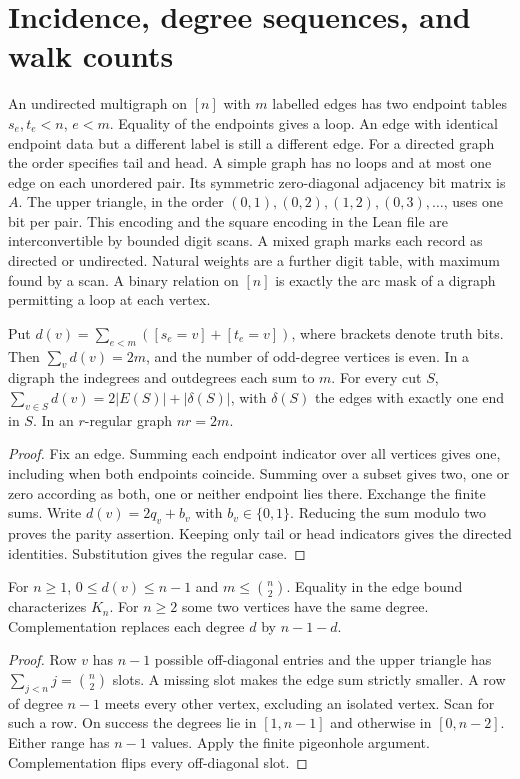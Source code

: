\section{Incidence, degree sequences, and walk counts}\label{sec:basic}
An undirected multigraph on $[n]$ with $m$ labelled edges has two endpoint
tables $s_e,t_e<n$, $e<m$. Equality of the endpoints gives a loop. An edge
with identical endpoint data but a different label is still a different edge.
For a directed graph the order specifies tail and head. A simple graph has no
loops and at most one edge on each unordered pair. Its symmetric zero-diagonal
adjacency bit matrix is $A$. The upper triangle, in the order
$(0,1),(0,2),(1,2),(0,3),\ldots$, uses one bit per pair. This encoding and the
square encoding in the Lean file are interconvertible by bounded digit scans.
A mixed graph marks each record as directed or undirected. Natural weights
are a further digit table, with maximum found by a scan. A binary relation on
$[n]$ is exactly the arc mask of a digraph permitting a loop at each vertex.

\begin{proposition}\leavevmode\label{prop:degree}
Put $d(v)=\sum_{e<m}([s_e=v]+[t_e=v])$, where brackets denote truth bits.
Then $\sum_vd(v)=2m$, and the number of odd-degree vertices is even. In a
digraph the indegrees and outdegrees each sum to $m$. For every cut $S$,
$\sum_{v\in S}d(v)=2|E(S)|+|\delta(S)|$, with $\delta(S)$ the edges with
exactly one end in $S$. In an $r$-regular graph $nr=2m$.
\end{proposition}
\begin{proof}
Fix an edge. Summing each endpoint indicator over all vertices gives one,
including when both endpoints coincide. Summing over a subset gives two,
one or zero according as both, one or neither endpoint lies there. Exchange
the finite sums. Write $d(v)=2q_v+b_v$ with $b_v\in\{0,1\}$. Reducing the
sum modulo two proves the parity assertion. Keeping only tail or head indicators
gives the directed identities. Substitution gives the regular case.
\end{proof}

\begin{proposition}\leavevmode\label{idx:elementary-simple-graph-degree-bounds}
For $n\ge 1$, $0\le d(v)\le n-1$ and $m\le\binom n2$. Equality in the
edge bound characterizes $K_n$. For $n\ge2$ some two vertices have the same
degree. Complementation replaces each degree $d$ by $n-1-d$.
\end{proposition}
\begin{proof}
Row $v$ has $n-1$ possible off-diagonal entries and the upper triangle has
$\sum_{j<n}j=\binom n2$ slots. A missing slot makes the edge sum strictly
smaller. A row of degree $n-1$ meets every other vertex, excluding an isolated
vertex. Scan for such a row. On success the degrees lie in $[1,n-1]$ and
otherwise in $[0,n-2]$. Either range has $n-1$ values. Apply the finite
pigeonhole argument. Complementation flips every off-diagonal slot.
\end{proof}

